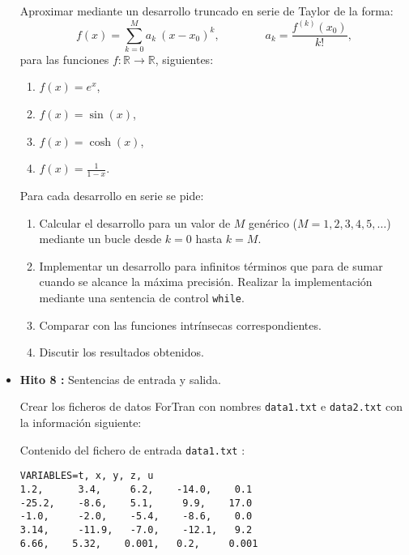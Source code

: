 \documentclass[12pt,spanish]{article}
\begin{document}
\begin{itemize}
Aproximar  mediante un desarrollo truncado en serie de Taylor de la forma:
\[  f(x) = \sum_{k=0} ^M a_k \  (x-x_0)^k, \qquad \qquad a_k = \frac{  f^{(k)} 
(x_0)  }{ k! },  \]  
para las funciones $f : \mathbb{R} \rightarrow \mathbb{R}$, siguientes:    
\begin{enumerate}
	\item $f(x) = e^x$,     
	\item $f(x) = \sin(x)$,   
	\item $f(x) = \cosh(x)$, 
	\item $f(x) = \displaystyle \frac{1}{1 - x}$.               
\end{enumerate}
Para cada desarrollo en serie se pide:    



\begin{enumerate}
	\item Calcular el desarrollo para un valor de $M$ genérico ($M=1, 2, 3, 4, 5, \hdots$) mediante un bucle desde $ k=0$ 
	hasta $ k = M $. 
	\item Implementar un desarrollo para infinitos términos que para de sumar cuando se alcance la máxima precisión. 
	Realizar la implementación mediante 
	una sentencia de control  \verb|while|.   
	\item Comparar con las funciones intrínsecas correspondientes.     
	\item Discutir los resultados obtenidos.
\end{enumerate}



\newpage 

\item {\bf Hito 8 :}   Sentencias de entrada y salida.

\vspace{0.5cm}    

Crear los ficheros de datos ForTran con nombres  \verb|data1.txt| e 
\verb|data2.txt| con la información siguiente:

\vspace{1cm}

Contenido del fichero de entrada \verb|data1.txt| :

\begin{verbatim}
VARIABLES=t, x, y, z, u
1.2,      3.4,     6.2,    -14.0,    0.1
-25.2,    -8.6,    5.1,     9.9,    17.0
-1.0,     -2.0,    -5.4,    -8.6,    0.0
3.14,     -11.9,   -7.0,    -12.1,   9.2
6.66,    5.32,    0.001,   0.2,     0.001
\end{verbatim}


\end{itemize}
\end{document}
